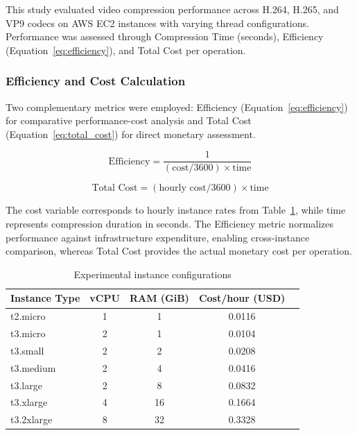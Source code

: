\documentclass[conference]{IEEEtran}
\begin{document}
	This study evaluated video compression performance across H.264, H.265, and VP9 codecs on AWS EC2 instances with varying thread configurations. Performance was assessed through Compression Time (seconds), Efficiency (Equation~\ref{eq:efficiency}), and Total Cost per operation.
	
	\subsubsection{Efficiency and Cost Calculation}
	\label{efficiency-calculation}
	
	Two complementary metrics were employed: Efficiency (Equation~\ref{eq:efficiency}) for comparative performance-cost analysis and Total Cost (Equation~\ref{eq:total_cost}) for direct monetary assessment.
	
	\begin{equation}
		\text{Efficiency} = \frac{1}{(\text{cost}/3600) \times \text{time}}
		\label{eq:efficiency}
	\end{equation}
	
	\begin{equation}
		\text{Total Cost} = (\text{hourly cost}/3600) \times \text{time}
		\label{eq:total_cost}
	\end{equation}
	
	The cost variable corresponds to hourly instance rates from Table~\ref{tab:experimental_configurations}, while time represents compression duration in seconds. The Efficiency metric normalizes performance against infrastructure expenditure, enabling cross-instance comparison, whereas Total Cost provides the actual monetary cost per operation.
	
	\begin{table}[H]
		\centering
		\caption{Experimental instance configurations}
		\label{tab:experimental_configurations}
		\begin{tabular}{|l|c|c|c|c|}
			\hline
			\textbf{Instance Type} & \textbf{vCPU} & \textbf{RAM (GiB)} & \textbf{Cost/hour (USD)}  \\
			\hline
			t2.micro & 1 & 1 & 0.0116  \\
			t3.micro & 2 & 1 & 0.0104 \\
			t3.small & 2 & 2 & 0.0208 \\
			t3.medium & 2 & 4 & 0.0416 \\
			t3.large & 2 & 8 & 0.0832 \\
			t3.xlarge & 4 & 16 & 0.1664 \\
			t3.2xlarge & 8 & 32 & 0.3328 \\
			\hline
		\end{tabular}
	\end{table}
	
\end{document}

